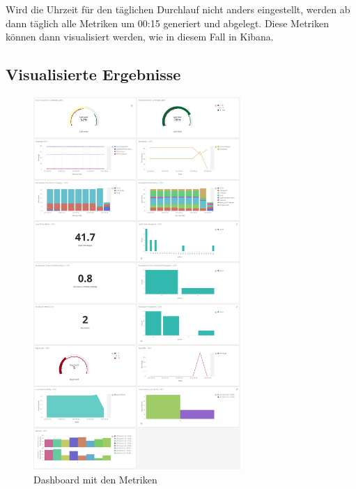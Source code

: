 Wird die Uhrzeit für den täglichen Durchlauf nicht anders eingestellt, werden ab dann täglich alle Metriken um 00:15 generiert und abgelegt.
Diese Metriken können dann visualisiert werden, wie in diesem Fall in Kibana.

\subsection{Visualisierte Ergebnisse}

\begin{savenotes}
    \begin{figure}[H] 
        \centering
            \includegraphics[width=0.7\textwidth]{img/dashboard.png}
        \caption{Dashboard mit den Metriken}\label{fig:dashboard}
    \end{figure}
\end{savenotes}

